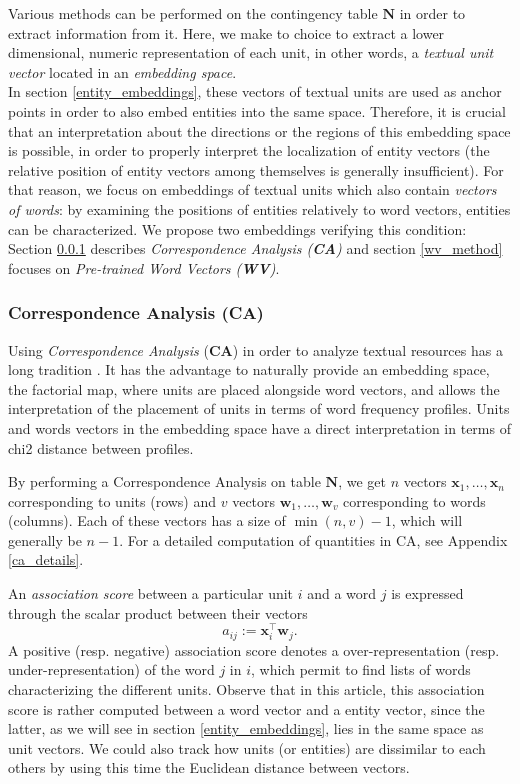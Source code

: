 \documentclass[
twocolumn,
]{ceurart}
\begin{document}
Various methods can be performed on the contingency table $\mathbf{N}$ in order to extract information from it. Here, we make to choice to extract a lower dimensional, numeric representation of each unit, in other words, a \emph{textual unit vector} located in an \emph{embedding space}. \\
In section \ref{entity_embeddings}, these vectors of textual units are used as anchor points in order to also embed entities into the same space. Therefore, it is crucial that an interpretation about the directions or the regions of this embedding space is possible, in order to properly interpret the localization of entity vectors (the relative position of entity vectors among themselves is generally insufficient). For that reason, we focus on embeddings of textual units which also contain \emph{vectors of words}: by examining the positions of entities relatively to word vectors, entities can be characterized. We propose two embeddings verifying this condition: Section \ref{ca_method} describes \emph{Correspondence Analysis (\textbf{CA})} and section \ref{wv_method} focuses on \emph{Pre-trained Word Vectors (\textbf{WV})}. 

\subsubsection{Correspondence Analysis (CA)}
\label{ca_method}

Using \emph{Correspondence Analysis} (\textbf{CA}) in order to analyze textual resources has a long tradition \cite{Lebart2019}. It has the advantage to naturally provide an embedding space, the factorial map, where units are placed alongside word vectors, and allows the interpretation of the placement of units in terms of word frequency profiles. Units and words vectors in the embedding space have a direct interpretation in terms of chi2 distance between profiles.

By performing a Correspondence Analysis on table $\mathbf{N}$, we get $n$ vectors $\mathbf{x}_1, \ldots, \mathbf{x}_n$ corresponding to units (rows) and $v$ vectors $\mathbf{w}_1, \ldots, \mathbf{w}_v$ corresponding to words (columns). Each of these vectors has a size of $\min(n, v) - 1$, which will generally be $n - 1$. For a detailed computation of quantities in CA, see Appendix \ref{ca_details}. 

An \emph{association score} between a particular unit $i$ and a word $j$ is expressed through the scalar product between their vectors 
\begin{equation}
a_{ij} := \mathbf{x}^\top_i \mathbf{w}_j.
\end{equation}
A positive (resp. negative) association score denotes a over-representation (resp. under-representation) of the word $j$ in $i$, which permit to find lists of words characterizing the different units. Observe that in this article, this association score is rather computed between a word vector and a entity vector, since the latter, as we will see in section \ref{entity_embeddings}, lies in the same space as unit vectors. We could also track how units (or entities) are dissimilar to each others by using this time the Euclidean distance between vectors.
\end{document}
